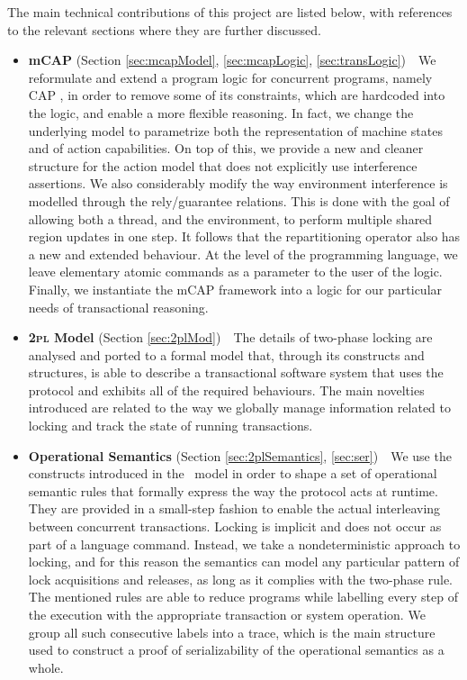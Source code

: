 The main technical contributions of this project are listed below, with references to the relevant sections where they are further discussed.
\begin{itemize}
	\item \textbf{mCAP} (Section \ref{sec:mcapModel}, \ref{sec:mcapLogic}, \ref{sec:transLogic})\ \ We reformulate and extend a program logic for concurrent programs, namely CAP \cite{cap}, in order to remove some of its constraints, which are hardcoded into the logic, and enable a more flexible reasoning. In fact, we change the underlying model to parametrize both the representation of machine states and of action capabilities. On top of this, we provide a new and cleaner structure for the action model that does not explicitly use interference assertions. We also considerably modify the way environment interference is modelled through the rely/guarantee relations. This is done with the goal of allowing both a thread, and the environment, to perform multiple shared region updates in one step. It follows that the repartitioning operator also has a new and extended behaviour. At the level of the programming language, we leave elementary atomic commands as a parameter to the user of the logic. Finally, we instantiate the mCAP framework into a logic for our particular needs of transactional reasoning.
	
	\item \textbf{\textsc{2pl} Model} (Section \ref{sec:2plMod})\ \ The details of two-phase locking are analysed and ported to a formal model that, through its constructs and structures, is able to describe a transactional software system that uses the protocol and exhibits all of the required behaviours. The main novelties introduced are related to the way we globally manage information related to locking and track the state of running transactions.
	
	\item \textbf{Operational Semantics} (Section \ref{sec:2plSemantics}, \ref{sec:ser})\ \ We use the constructs introduced in the \tpl\ model in order to shape a set of operational semantic rules that formally express the way the protocol acts at runtime. They are provided in a small-step fashion to enable the actual interleaving between concurrent transactions. Locking is implicit and does not occur as part of a language command. Instead, we take a nondeterministic approach to locking, and for this reason the semantics can model any particular pattern of lock acquisitions and releases, as long as it complies with the two-phase rule. The mentioned rules are able to reduce programs while labelling every step of the execution with the appropriate transaction or system operation. We group all such consecutive labels into a trace, which is the main structure used to construct a proof of serializability of the operational semantics as a whole. 
	

\end{itemize}
